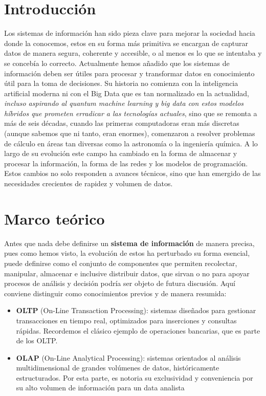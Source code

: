 \documentclass[12pt]{article}
\numberwithin{equation}{section}
\numberwithin{figure}{section}
\numberwithin{table}{section}
\begin{document}
\section{Introducción}
Los sistemas de información han sido pieza clave para mejorar la sociedad hacia donde la conocemos, estos en su forma más primitiva se encargan de capturar datos de manera segura, coherente y accesible, o al menos es lo que se intentaba y se concebía lo correcto. Actualmente hemos añadido que los sistemas de información deben ser útiles para procesar y transformar datos en conocimiento útil para la toma de decisiones. Su historia no comienza con la inteligencia artificial moderna ni con el Big Data que es tan normalizado en la actualidad, \textit{incluso aspirando al quantum machine learning y big data con estos modelos híbridos que prometen erradicar a las tecnologías actuales}, sino que se remonta a más de seis décadas, cuando las primeras computadoras eran más discretas (aunque sabemos que ni tanto, eran enormes), comenzaron a resolver problemas de cálculo en áreas tan diversas como la astronomía o la ingeniería química.
A lo largo de su evolución este campo ha cambiado en la forma de almacenar y procesar la información, la forma de las redes y los modelos de programación. Estos cambios no solo responden a avances técnicos, sino que han emergido de las necesidades crecientes de rapidez y volumen de datos. 


\section{Marco teórico}
Antes que nada debe definirse un \textbf{sistema de información} de manera precisa, pues como hemos visto, la evolución de estos ha perturbado su forma esencial, puede definirse como el conjunto de componentes que permiten recolectar, manipular, almacenar e inclusive distribuir datos, que sirvan o no para apoyar procesos de análisis y decisión podría ser objeto de futura discusión. Aquí conviene distinguir como conocimientos previos y de manera resumida:

\begin{itemize}
\item \textbf{OLTP} (On-Line Transaction Processing): sistemas diseñados para gestionar transacciones en tiempo real, optimizados para inserciones y consultas rápidas. Recordemos el clásico ejemplo de operaciones bancarias, que es parte de los OLTP.
\item \textbf{OLAP} (On-Line Analytical Processing): sistemas orientados al análisis multidimensional de grandes volúmenes de datos, históricamente estructurados. Por esta parte, es notoria su exclusividad y conveniencia por su alto volumen de información para un data analista
\end{itemize}
\end{document}
